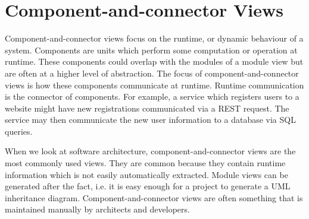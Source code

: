 \section{Component-and-connector Views}
Component-and-connector views focus on the runtime, or dynamic behaviour of a system.
Components are units which perform some computation or operation at runtime.
These components could overlap with the modules of a module view but are often at a higher level of abstraction.
The focus of component-and-connector views is how these components communicate at runtime.
Runtime communication is the connector of components.
For example, a service which registers users to a website might have new registrations communicated via a REST request.
The service may then communicate the new user information to a database via SQL queries.

When we look at software architecture, component-and-connector views are the most commonly used views.
They are common because they contain runtime information which is not easily automatically extracted.
Module views can be generated after the fact, i.e. it is easy enough for a project to generate a UML inheritance diagram.
Component-and-connector views are often something that is maintained manually by architects and developers.
